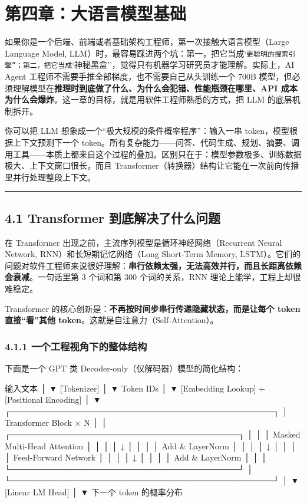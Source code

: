 \chapter{第四章：大语言模型基础}

如果你是一个后端、前端或者基础架构工程师，第一次接触大语言模型（Large Language Model, LLM）时，最容易踩进两个坑：第一，把它当成`\texttt{更聪明的搜索引擎''；第二，把它当成}`神秘黑盒''，觉得只有机器学习研究员才能理解。实际上，AI Agent 工程师不需要手推全部梯度，也不需要自己从头训练一个 700B 模型，但必须理解模型在\textbf{推理时到底做了什么、为什么会犯错、性能瓶颈在哪里、API 成本为什么会爆炸}。这一章的目标，就是用软件工程师熟悉的方式，把 LLM 的底层机制拆开。


你可以把 LLM 想象成一个``极大规模的条件概率程序''：输入一串 token，模型根据上下文预测下一个 token。所有复杂能力------问答、代码生成、规划、摘要、调用工具------本质上都来自这个过程的叠加。区别只在于：模型参数极多、训练数据极大、上下文窗口很长，而且 Transformer（转换器）结构让它能在一次前向传播里并行处理整段上下文。


\bigskip\hrule\bigskip

\section{4.1 Transformer 到底解决了什么问题}

在 Transformer 出现之前，主流序列模型是循环神经网络（Recurrent Neural Network, RNN）和长短期记忆网络（Long Short-Term Memory, LSTM）。它们的问题对软件工程师来说很好理解：\textbf{串行依赖太强，无法高效并行，而且长距离依赖会衰减}。一句话里第 3 个词和第 300 个词的关系，RNN 理论上能学，工程上却很难稳定。


Transformer 的核心创新是：\textbf{不再按时间步串行传递隐藏状态，而是让每个 token 直接``看''其他 token}。这就是自注意力（Self-Attention）。


\subsection{4.1.1 一个工程视角下的整体结构}

下面是一个 GPT 类 Decoder-only（仅解码器）模型的简化结构：


\begin{codeblock}
输入文本
   │
   ▼
[Tokenizer]
   │
   ▼
Token IDs
   │
   ▼
[Embedding Lookup] + [Positional Encoding]
   │
   ▼
┌─────────────────────────────────────────────┐
│ Transformer Block × N                       │
│  ┌───────────────────────────────────────┐  │
│  │ Masked Multi-Head Attention           │  │
│  │   ↓                                   │  │
│  │ Add & LayerNorm                       │  │
│  │   ↓                                   │  │
│  │ Feed-Forward Network                  │  │
│  │   ↓                                   │  │
│  │ Add & LayerNorm                       │  │
│  └───────────────────────────────────────┘  │
└─────────────────────────────────────────────┘
   │
   ▼
[Linear LM Head]
   │
   ▼
下一个 token 的概率分布
\end{codeblock}

